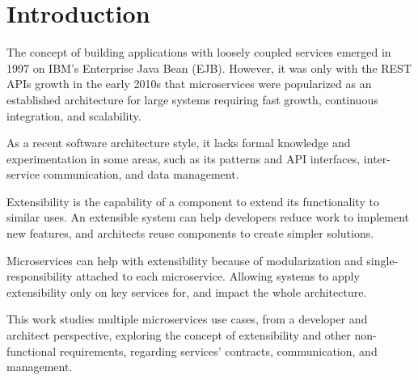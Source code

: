 \chapter{Introduction}
\label{cap:introduction}

\enlargethispage{.5\baselineskip}

The concept of building applications with loosely coupled services emerged in 1997 on IBM's Enterprise Java Bean (EJB). However, it was only with the REST APIs growth in the early 2010s that microservices were popularized as an established architecture for large systems requiring fast growth, continuous integration, and scalability.

As a recent software architecture style, it lacks formal knowledge and experimentation in some areas, such as its patterns and API interfaces, inter-service communication, and data management.

Extensibility is the capability of a component to extend its functionality to similar uses. An extensible system can help developers reduce work to implement new features, and architects reuse components to create simpler solutions.

Microservices can help with extensibility because of modularization and single-responsibility attached to each microservice. Allowing systems to apply extensibility only on key services for, and impact the whole architecture.

This work studies multiple microservices use cases, from a developer and architect perspective, exploring the concept of extensibility and other non-functional requirements, regarding services’ contracts, communication, and management.
